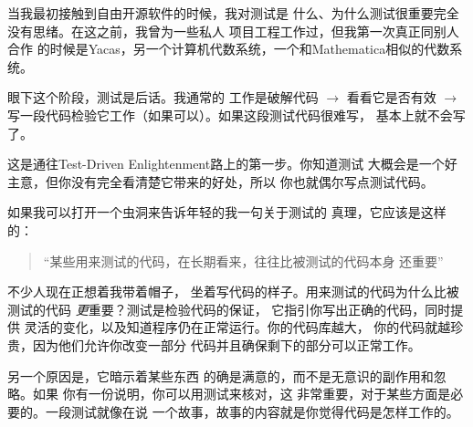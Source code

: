 

\noindent{}当我最初接触到自由开源软件的时候，我对测试是
什么、为什么测试很重要完全没有思绪。在这之前，我曾为一些私人
项目工程工作过，但我第一次真正同别人合作
的时候是Yacas，另一个计算机代数系统，一个和Mathematica相似的代数系统。

眼下这个阶段，测试是后话。我通常的
工作是破解代码 $\rightarrow$ 看看它是否有效 $\rightarrow$
写一段代码检验它工作（如果可以）。如果这段测试代码很难写，
基本上就不会写了。

这是通往Test-Driven Enlightenment路上的第一步。你知道测试
大概会是一个好主意，但你没有完全看清楚它带来的好处，所以
你也就偶尔写点测试代码。

如果我可以打开一个虫洞来告诉年轻的我一句关于测试的
真理，它应该是这样的：
\begin{quote}“某些用来测试的代码，在长期看来，往往比被测试的代码本身
还重要”\end{quote}

不少人现在正想着我带着帽子，
坐着写代码的样子。用来测试的代码为什么比被测试的代码
\emph{更}重要？测试是检验代码的保证，
它指引你写出正确的代码，同时提供
灵活的变化，以及知道程序仍在正常运行。你的代码库越大，
你的代码就越珍贵，因为他们允许你改变一部分
代码并且确保剩下的部分可以正常工作。

另一个原因是，它暗示着某些东西
的确是满意的，而不是无意识的副作用和忽略。如果
你有一份说明，你可以用测试来核对，这
非常重要，对于某些方面是必要的。一段测试就像在说
一个故事，故事的内容就是你觉得代码是怎样工作的。



















